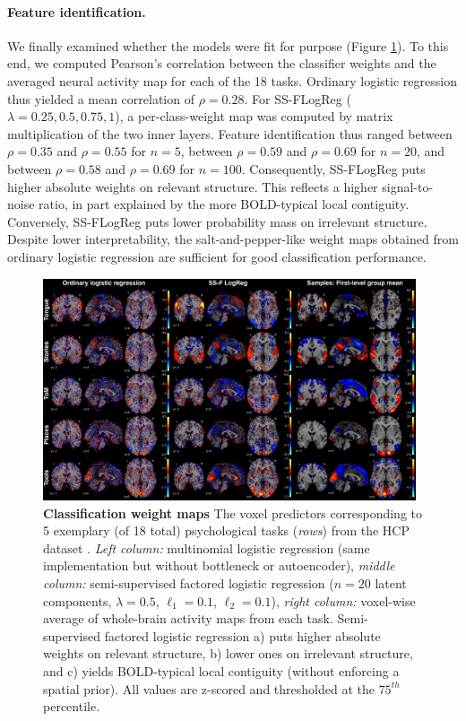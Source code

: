 \documentclass{article} %
\begin{document}
\paragraph{Feature identification.}
We finally examined whether the models
were fit for purpose
(Figure \ref{fig_weights}).
%
To this end, we computed Pearson's correlation between the classifier weights
and the averaged neural activity map for each of the 18 tasks.
%
Ordinary logistic regression thus yielded a mean correlation
of $\rho=0.28$.
%
For SS-FLogReg ($\lambda=0.25, 0.5, 0.75, 1$),
a per-class-weight map was computed by matrix
multiplication of the two inner layers.
Feature identification thus ranged
between $\rho=0.35$ and $\rho=0.55$ for $n=5$,
between $\rho=0.59$ and $\rho=0.69$ for $n=20$, and
between $\rho=0.58$ and $\rho=0.69$ for $n=100$.
%
Consequently,
SS-FLogReg puts higher absolute weights on relevant structure.
This reflects a higher signal-to-noise ratio, in part explained
by the more BOLD-typical local contiguity.
%
Conversely, SS-FLogReg puts lower probability mass on irrelevant structure.
Despite lower interpretability, the
salt-and-pepper-like weight maps obtained from
ordinary logistic regression are sufficient for
good classification performance.
%
\begin{figure}
\begin{centering}
\includegraphics[width=0.98\textwidth]{figures/figure_weights_perc75.png}
\end{centering}
\vspace{-0.1cm}
\caption{\textbf{Classification weight maps}
The voxel predictors corresponding to 5 exemplary
(of 18 total) psychological tasks (\textit{rows})
from the HCP dataset \cite{barch2013}.
\textit{Left column:} multinomial logistic regression (same
implementation but without bottleneck or autoencoder),
\textit{middle column:} semi-supervised factored logistic regression
($n=20$ latent components, $\lambda=0.5$, $\ell_1=0.1$, $\ell_2=0.1$),
\textit{right column:} voxel-wise average of whole-brain
activity maps from each task.
Semi-supervised factored logistic regression
a) puts higher absolute weights on relevant structure,
b) lower ones on irrelevant structure,
and
c) yields BOLD-typical local contiguity (without enforcing a spatial prior).
All values are z-scored and thresholded at the $75^{th}$ percentile.
}
\label{fig_weights}
\end{figure}
\end{document}
